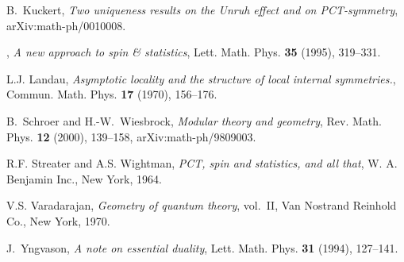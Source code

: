 \documentclass[a4paper,reqno,11pt]{amsart}
\theoremstyle{plain}
\theoremstyle{definition}
\numberwithin{equation}{section}
\begin{document}
\begin{thebibliography}{10}
B.~Kuckert, \emph{Two uniqueness results on the {U}nruh effect and on
  {PCT}-symmetry}, arXiv:math-ph/0010008.

\bysame, \emph{A new approach to spin \& statistics}, Lett. Math. Phys.
  \textbf{35} (1995), 319--331.

L.J. Landau, \emph{Asymptotic locality and the structure of local internal
  symmetries.}, Commun. Math. Phys. \textbf{17} (1970), 156--176.

B.~Schroer and H.-W.~Wiesbrock, \emph{Modular theory and geo\-met\-ry},
  Rev. Math. Phys. \textbf{12} (2000), 139--158, arXiv:math-ph/9809003.

R.F. Streater and A.S. Wightman, \emph{{PCT}, spin and statistics, and all
  that}, W. A. Benjamin Inc., New York, 1964.

V.S. Varadarajan, \emph{Geometry of quantum theory}, vol.~II, Van Nostrand
  Reinhold Co., New York, 1970.

J.~Yngvason, \emph{A note on essential duality}, Lett. Math. Phys. \textbf{31}
  (1994), 127--141.
\end{thebibliography}
\end{document}
